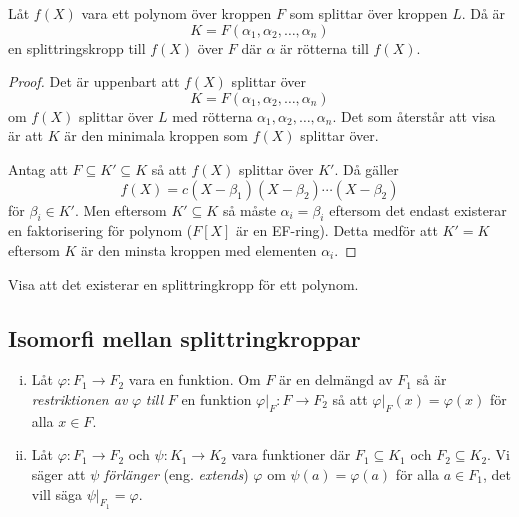 \documentclass{article}
\theoremstyle{definition}
\begin{document}
\hypertarget{lemma6.0.1}{}
\begin{mylemma}{}{}
  Låt $f(X)$ vara ett polynom över kroppen $F$ som splittar över kroppen $L$. Då är 
  \[K = F(\alpha_1, \alpha_2, \ldots, \alpha_n)\]
  en splittringskropp till $f(X)$ över $F$ där $\alpha$ är rötterna till $f(X)$.
\end{mylemma}

\begin{proof}
  Det är uppenbart att $f(X)$ splittar över 
  \[K = F(\alpha_1, \alpha_2, \ldots, \alpha_n)\]
  om $f(X)$ splittar över $L$ med rötterna $\alpha_1, \alpha_2, \ldots, \alpha_n$. Det som återstår att visa är att 
  $K$ är den minimala kroppen som $f(X)$ splittar över. 

  Antag att $F \subseteq K' \subseteq K$ så att $f(X)$ splittar över $K'$. Då gäller 
  \[f(X) = c(X- \beta_1)(X - \beta_2)\cdots (X - \beta_2)\]
  för $\beta_i \in K'.$ 
  Men eftersom $K' \subseteq K$ så måste $\alpha_i = \beta_i$ eftersom det endast existerar en faktorisering för polynom ($F[X]$ är en EF-ring). 
  Detta medför att $K' = K$ eftersom $K$ är den minsta kroppen med elementen $\alpha_i$.
\end{proof}

\begin{ovning}{6}
  Visa att det existerar en splittringkropp för ett polynom.
\end{ovning}

\subsection{Isomorfi mellan splittringkroppar}
\begin{mydef}{}{}
  \begin{enumerate}[(i)]
    \item   Låt $\varphi: F_1 \rightarrow F_2$ vara en funktion. Om $F$ är en delmängd av $F_1$ så är \textit{restriktionen av} $\varphi$ \textit{till} $F$
    en funktion $\varphi|_F: F \rightarrow F_2$ så att $\varphi|_F(x) = \varphi(x)$ för alla $x \in F.$
    \item   Låt $\varphi: F_1 \rightarrow F_2$ och $\psi: K_1 \rightarrow K_2$ vara funktioner där $F_1 \subseteq K_1$
    och $F_2 \subseteq K_2$. 
    Vi säger att $\psi$ \textit{förlänger} (eng. \textit{extends})
    $\varphi$ om $\psi(a) = \varphi(a)$ för alla $a \in F_1$, det vill säga $\psi |_{F_1} = \varphi.$
  \end{enumerate}
\end{mydef}
\end{document}
